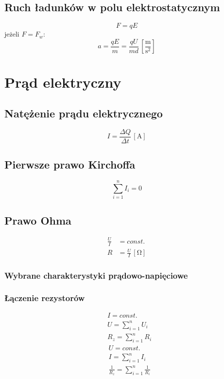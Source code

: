 \documentclass{article}
\numberwithin{equation}{section}
\newcommand{\unit}[1]{\, \left[\mathrm{#1}\right]}
\begin{document}
    \subsection{Ruch ładunków w polu elektrostatycznym}
      \begin{equation}
        F = qE
      \end{equation}
      jeżeli $F = F_w$:
      \begin{equation}
        a = \frac{qE}{m} = \frac{qU}{md} \unit{\frac{m}{s^2}}
      \end{equation}

  \newpage
  \section{Prąd elektryczny}
    \subsection{Natężenie prądu elektrycznego}
      \begin{equation}
        I = \frac{\Delta Q}{\Delta t} \unit{A}
      \end{equation}
    \subsection{Pierwsze prawo Kirchoffa}
      \begin{equation}
        \sum_{i=1}^n I_i = 0
      \end{equation}
    \subsection{Prawo Ohma}
      \begin{align}
        \frac{U}{I} &= const.\\
        R &= \frac{U}{I} \unit{\Omega}
      \end{align}
      \subsubsection{Wybrane charakterystyki prądowo-napięciowe}
      \subsubsection{Łączenie rezystorów}
        \begin{align}
          &I = const.\\
          &U = \sum_{i=1}^n U_i\\
          &R_z = \sum_{i=1}^n R_i
        \end{align}
        \begin{align}
          &U = const.\\
          &I = \sum_{i=1}^n I_i\\
          &\frac{1}{R_z} = \sum_{i=1}^n \frac{1}{R_i}
        \end{align}
\end{document}
